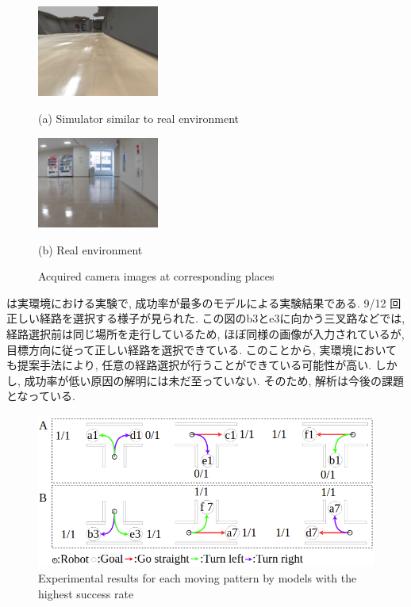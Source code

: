 \begin{figure}[h]
  \centering
  \begin{minipage}[b]{67mm}
    \centering
    \includegraphics[width=40mm]{images/horizonal_sim.png}
    \caption*{(a) Simulator similar to real environment}
  \end{minipage} 
  \begin{minipage}[b]{67mm}
    \centering
    \includegraphics[width=40mm]{images/horizonal_real.png}
    \caption*{(b) Real environment}
  \end{minipage}
  \caption{Acquired camera images at corresponding places}
  \label{Fig:horizonal}
\end{figure}

は実環境における実験で, 成功率が最多のモデルによる実験結果である. 9/12 回正しい経路を選択する様子が見られた. この図のb3とe3に向かう三叉路などでは, 経路選択前は同じ場所を走行しているため, ほぼ同様の画像が入力されているが, 目標方向に従って正しい経路を選択できている. このことから, 実環境においても提案手法により, 任意の経路選択が行うことができている可能性が高い.
しかし, 成功率が低い原因の解明には未だ至っていない. そのため, 解析は今後の課題となっている.

\begin{figure}[hbtp]
  \centering
 \includegraphics[keepaspectratio, scale=0.45]
      {images/real_model3.png}
 \caption{Experimental results for each moving pattern by models with the highest success rate}
 \label{Fig:real_model3}
\end{figure}

\newpage
